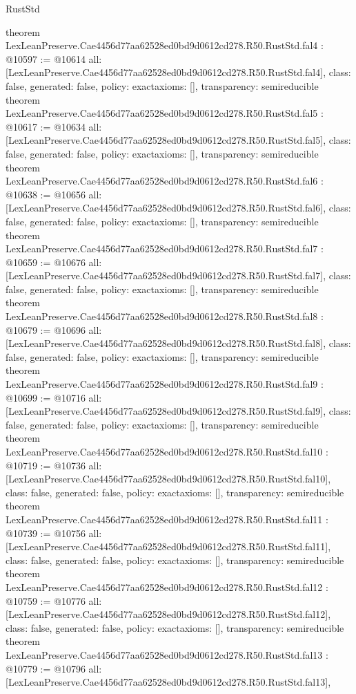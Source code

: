 \begin{lexlean}{RustStd}
\begin{coremodule}
{}
theorem LexLeanPreserve.Cae4456d77aa62528ed0bd9d0612cd278.R50.RustStd.fal4 : @10597 := @10614 {
  all: [LexLeanPreserve.Cae4456d77aa62528ed0bd9d0612cd278.R50.RustStd.fal4],
  class: false,
  generated: false,
  policy: exact{axioms: []},
  transparency: semireducible
}
theorem LexLeanPreserve.Cae4456d77aa62528ed0bd9d0612cd278.R50.RustStd.fal5 : @10617 := @10634 {
  all: [LexLeanPreserve.Cae4456d77aa62528ed0bd9d0612cd278.R50.RustStd.fal5],
  class: false,
  generated: false,
  policy: exact{axioms: []},
  transparency: semireducible
}
theorem LexLeanPreserve.Cae4456d77aa62528ed0bd9d0612cd278.R50.RustStd.fal6 : @10638 := @10656 {
  all: [LexLeanPreserve.Cae4456d77aa62528ed0bd9d0612cd278.R50.RustStd.fal6],
  class: false,
  generated: false,
  policy: exact{axioms: []},
  transparency: semireducible
}
theorem LexLeanPreserve.Cae4456d77aa62528ed0bd9d0612cd278.R50.RustStd.fal7 : @10659 := @10676 {
  all: [LexLeanPreserve.Cae4456d77aa62528ed0bd9d0612cd278.R50.RustStd.fal7],
  class: false,
  generated: false,
  policy: exact{axioms: []},
  transparency: semireducible
}
theorem LexLeanPreserve.Cae4456d77aa62528ed0bd9d0612cd278.R50.RustStd.fal8 : @10679 := @10696 {
  all: [LexLeanPreserve.Cae4456d77aa62528ed0bd9d0612cd278.R50.RustStd.fal8],
  class: false,
  generated: false,
  policy: exact{axioms: []},
  transparency: semireducible
}
theorem LexLeanPreserve.Cae4456d77aa62528ed0bd9d0612cd278.R50.RustStd.fal9 : @10699 := @10716 {
  all: [LexLeanPreserve.Cae4456d77aa62528ed0bd9d0612cd278.R50.RustStd.fal9],
  class: false,
  generated: false,
  policy: exact{axioms: []},
  transparency: semireducible
}
theorem LexLeanPreserve.Cae4456d77aa62528ed0bd9d0612cd278.R50.RustStd.fal10 : @10719 := @10736 {
  all: [LexLeanPreserve.Cae4456d77aa62528ed0bd9d0612cd278.R50.RustStd.fal10],
  class: false,
  generated: false,
  policy: exact{axioms: []},
  transparency: semireducible
}
theorem LexLeanPreserve.Cae4456d77aa62528ed0bd9d0612cd278.R50.RustStd.fal11 : @10739 := @10756 {
  all: [LexLeanPreserve.Cae4456d77aa62528ed0bd9d0612cd278.R50.RustStd.fal11],
  class: false,
  generated: false,
  policy: exact{axioms: []},
  transparency: semireducible
}
theorem LexLeanPreserve.Cae4456d77aa62528ed0bd9d0612cd278.R50.RustStd.fal12 : @10759 := @10776 {
  all: [LexLeanPreserve.Cae4456d77aa62528ed0bd9d0612cd278.R50.RustStd.fal12],
  class: false,
  generated: false,
  policy: exact{axioms: []},
  transparency: semireducible
}
theorem LexLeanPreserve.Cae4456d77aa62528ed0bd9d0612cd278.R50.RustStd.fal13 : @10779 := @10796 {
  all: [LexLeanPreserve.Cae4456d77aa62528ed0bd9d0612cd278.R50.RustStd.fal13],
}
\end{coremodule}
\end{lexlean}
